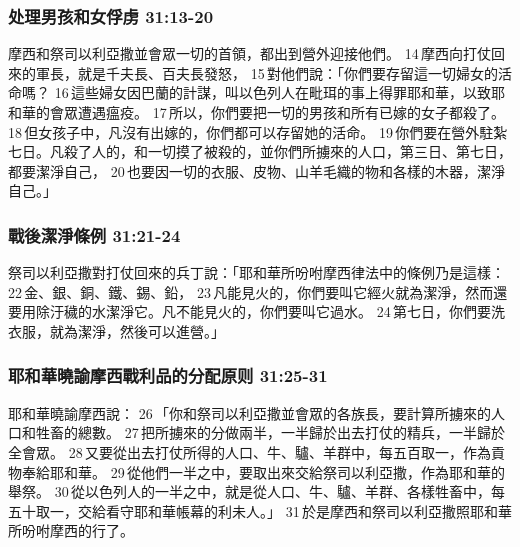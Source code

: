 \subsubsection{处理男孩和女俘虏 31:13-20}
摩西和祭司以利亞撒並會眾一切的首領，都出到營外迎接他們。 14 摩西向打仗回來的軍長，就是千夫長、百夫長發怒， 15 對他們說：「你們要存留這一切婦女的活命嗎？ 16 這些婦女因巴蘭的計謀，叫以色列人在毗珥的事上得罪耶和華，以致耶和華的會眾遭遇瘟疫。 17 所以，你們要把一切的男孩和所有已嫁的女子都殺了。 18 但女孩子中，凡沒有出嫁的，你們都可以存留她的活命。 19 你們要在營外駐紮七日。凡殺了人的，和一切摸了被殺的，並你們所擄來的人口，第三日、第七日，都要潔淨自己， 20 也要因一切的衣服、皮物、山羊毛織的物和各樣的木器，潔淨自己。」

\subsubsection{戰後潔淨條例 31:21-24} 
祭司以利亞撒對打仗回來的兵丁說：「耶和華所吩咐摩西律法中的條例乃是這樣： 22 金、銀、銅、鐵、錫、鉛， 23 凡能見火的，你們要叫它經火就為潔淨，然而還要用除汙穢的水潔淨它。凡不能見火的，你們要叫它過水。 24 第七日，你們要洗衣服，就為潔淨，然後可以進營。」

\subsubsection{耶和華曉諭摩西戰利品的分配原则 31:25-31} 	
耶和華曉諭摩西說： 26 「你和祭司以利亞撒並會眾的各族長，要計算所擄來的人口和牲畜的總數。 27 把所擄來的分做兩半，一半歸於出去打仗的精兵，一半歸於全會眾。 28 又要從出去打仗所得的人口、牛、驢、羊群中，每五百取一，作為貢物奉給耶和華。 29 從他們一半之中，要取出來交給祭司以利亞撒，作為耶和華的舉祭。 30 從以色列人的一半之中，就是從人口、牛、驢、羊群、各樣牲畜中，每五十取一，交給看守耶和華帳幕的利未人。」 31 於是摩西和祭司以利亞撒照耶和華所吩咐摩西的行了。

